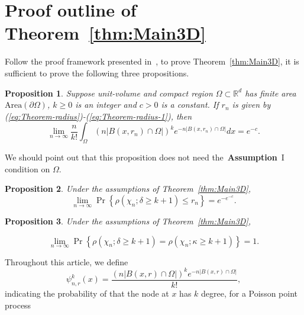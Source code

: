 \documentclass[preprint,12pt]{elsarticle}
\newtheorem{proposition}{Proposition}
\begin{document}
\section{Proof outline of Theorem~\ref{thm:Main3D}}





Follow the proof framework presented in~\cite{Ding-RGG2018, Ding-RGG2025, Ding2022-3DRadii}, to prove Theorem~\ref{thm:Main3D}, it is sufficient to prove the following three propositions.

\begin{proposition}\label{pro:Explicit-Form}
Suppose unit-volume and compact region $\Omega\subset \mathbb{R}^d$
  has finite area   $\mathrm{Area}(\partial\Omega)$,
 $k\geq 0$ is an integer and $c>0$ is a constant.
If $r_n$ is given by (\ref{eq:Theorem-radius})-(\ref{eq:Theorem-radius-1}), then
\begin{equation}\label{eq:Explicit-Form}
       \lim_{n\rightarrow\infty} \frac n{k!}\int_{\Omega}\left(n|B(x,r_n)\cap\Omega|\right)^k e^{-n|B(x,r_n)\cap\Omega|}dx= e^{-c}.
\end{equation}
\end{proposition}
We should point out that this proposition does not need the~\textbf{Assumption}~I condition on $\Omega$.




\begin{proposition}\label{pro:conclusion-1}   Under the assumptions of Theorem~\ref{thm:Main3D},
\begin{equation}\label{eq:conclusion-1}
\lim_{n\rightarrow\infty}\Pr\left\{\rho(\chi_n;\delta\geq k+1)\leq r_n\right\} =e^{-e^{-c}}.
\end{equation}
\end{proposition}





\begin{proposition}\label{pro:conclusion-2}  Under the assumptions of Theorem~\ref{thm:Main3D},

\begin{equation}\label{eq:conclusion-2}
\lim_{n\rightarrow\infty}\Pr\left\{\rho(\chi_n;\delta\geq k+1)=\rho(\chi_n;\kappa\geq
k+1)\right\}=1.
\end{equation}
\end{proposition}





Throughout this article, we define
\begin{equation}\label{eq:psi-function}
       \psi^k_{n,r}(x)= \frac{\left(n|B(x,r)\cap\Omega|\right)^k
       e^{-n|B(x,r)\cap\Omega|}}{k!},
\end{equation}
indicating the probability of that the node at $x$ has $k$ degree, for a Poisson point process
\end{document}
